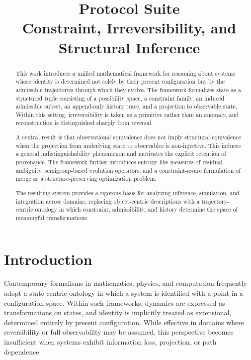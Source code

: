 \documentclass[11pt,oneside]{article}
\title{\textbf{Protocol Suite}\\[0.5em]
\large Constraint, Irreversibility, and Structural Inference}
\author{}
\date{}
\begin{document}
\maketitle

\begin{abstract}

This work introduces a unified mathematical framework for reasoning about systems whose identity is determined not solely by their present configuration but by the admissible trajectories through which they evolve. The framework formalizes state as a structured tuple consisting of a possibility space, a constraint family, an induced admissible subset, an append-only history trace, and a projection to observable state. Within this setting, irreversibility is taken as a primitive rather than an anomaly, and reconstruction is distinguished sharply from reversal. 

A central result is that observational equivalence does not imply structural equivalence when the projection from underlying state to observables is non-injective. This induces a general indistinguishability phenomenon and motivates the explicit retention of provenance. The framework further introduces entropy-like measures of residual ambiguity, semigroup-based evolution operators, and a constraint-aware formulation of merge as a structure-preserving optimization problem. 

The resulting system provides a rigorous basis for analyzing inference, simulation, and integration across domains, replacing object-centric descriptions with a trajectory-centric ontology in which constraint, admissibility, and history determine the space of meaningful transformations.

\end{abstract}

\newpage

\section{Introduction}

Contemporary formalisms in mathematics, physics, and computation frequently adopt a state-centric ontology in which a system is identified with a point in a configuration space. Within such frameworks, dynamics are expressed as transformations on states, and identity is implicitly treated as extensional, determined entirely by present configuration. While effective in domains where reversibility or full observability may be assumed, this perspective becomes insufficient when systems exhibit information loss, projection, or path dependence.
\end{document}
